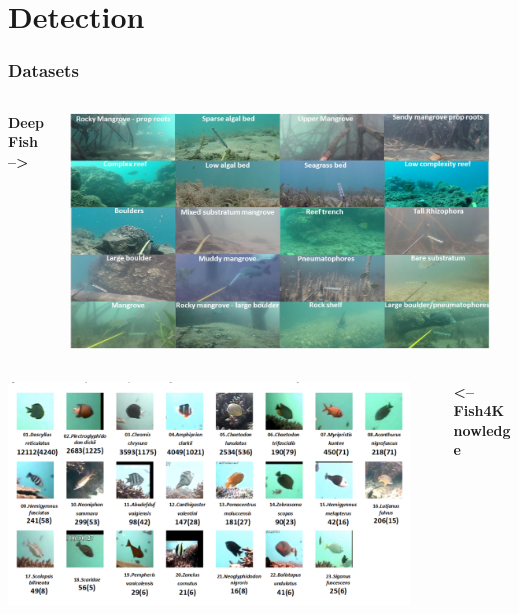 \documentclass[serif]{beamer}  %
\begin{document}
\section{Detection}

\begin{frame}
\frametitle{Datasets}
\begin{columns}
\begin{column}{0.5\textwidth}
	\centering
	\textbf{DeepFish  --> }\\
\end{column}

\begin{column}{0.5\textwidth}
	\centering
	\includegraphics[width=0.95\textwidth]{images/deepfish.png}
\end{column}
\end{columns}

\vspace{1cm}

\begin{columns}
\begin{column}{0.5\textwidth}
	\centering
	\includegraphics[width=0.95\textwidth]{images/f4k.png}	
\end{column}

\begin{column}{0.5\textwidth}
	\centering
	\textbf{<--  Fish4Knowledge}
\end{column}
\end{columns}
\end{frame}
\end{document}
